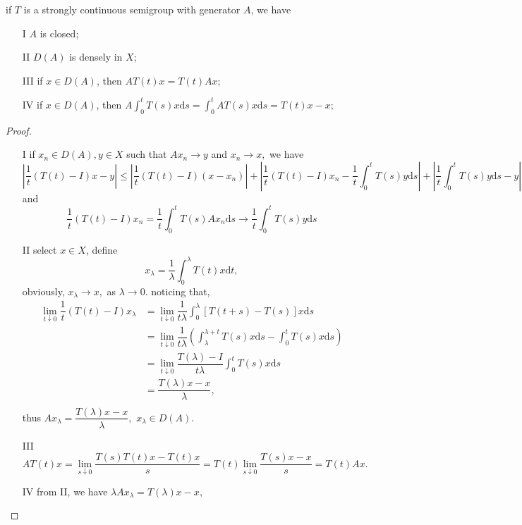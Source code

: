 \begin{proposition}
	if $T$ is a strongly continuous semigroup with generator $A$, we have 
	
	\begin{itemize}
		\item [I] $A$ is closed;
		\item [II] $D(A)$ is densely in $X$; 
		\item [III] if $x\in D(A)$, then $AT(t)x = T(t)Ax;$
		\item [IV] if $x\in D(A)$, then $A\int_0^tT(s)x\mathrm{d}s=\int_0^tAT(s)x\mathrm{d}s= T(t)x - x;$
	\end{itemize}
\end{proposition}


\begin{proof}
	\begin{itemize}
		\item [I] if $x_n\in D(A), y\in X$ such that $Ax_n\rightarrow y$ and $x_n\rightarrow x,$ we have
	$$|\frac{1}{t}(T(t)-I)x-y| \leqslant |\frac{1}{t}(T(t)-I)(x - x_n)| + |\frac{1}{t}(T(t)-I)x_n-\dfrac{1}{t}\int_0^tT(s)y\mathrm{d}s| + |\dfrac{1}{t}\int_0^tT(s)y\mathrm{d}s-y|$$
	and $$\frac{1}{t}(T(t)-I) x_n = \dfrac{1}{t}\int_0^tT(s)Ax_n\mathrm{d}s\rightarrow \dfrac{1}{t}\int_0^tT(s)y\mathrm{d}s$$
	
	\item [II] select $x\in X$, define \begin{equation*}
		x_\lambda = \dfrac{1}{\lambda}\int_0^\lambda T(t)x\mathrm{d}t,
	\end{equation*}
obviously, $x_\lambda\rightarrow x,$ as $\lambda\rightarrow0.$ noticing that,
\begin{equation}
	\begin{split}
		\lim\limits_{t\downarrow0}\dfrac{1}{t}(T(t)-I)x_\lambda &= \lim\limits_{t\downarrow0}\dfrac{1}{t\lambda}\int_0^\lambda [T(t+s)-T(s)]x\mathrm{d}s\\
		&= \lim\limits_{t\downarrow0}\dfrac{1}{t\lambda}(\int_\lambda^{\lambda + t}T(s)x\mathrm{d}s -
		\int_0^t T(s)x\mathrm{d}s)\\
		&= \lim\limits_{t\downarrow0}\dfrac{T(\lambda)- I}{t\lambda}\int_0^t T(s)x\mathrm{d}s\\
		&= \dfrac{T(\lambda)x- x}\lambda,\\
	\end{split}
\end{equation}
thus $Ax_\lambda = \dfrac{T(\lambda)x- x}\lambda,$ $x_\lambda \in D(A).$
\item [III] \begin{equation}
	AT(t)x = \lim\limits_{s\downarrow0}\dfrac{T(s)T(t)x - T(t)x}{s}= T(t)\lim\limits_{s\downarrow0}\dfrac{T(s)x - x}{s} = T(t)Ax.
\end{equation}
\item [IV] from II, we have $\lambda Ax_\lambda = T(\lambda)x - x,$
\end{itemize}
\end{proof}


